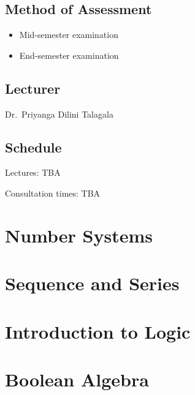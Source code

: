 \documentclass[]{book}
\providecommand{\tightlist}{%
  \setlength{\itemsep}{0pt}\setlength{\parskip}{0pt}}
\begin{document}
\hypertarget{method-of-assessment}{%
\section*{Method of Assessment}\label{method-of-assessment}}

\begin{itemize}
\tightlist
\item
  Mid-semester examination
\item
  End-semester examination
\end{itemize}

\hypertarget{lecturer}{%
\section*{Lecturer}\label{lecturer}}

Dr.~Priyanga Dilini Talagala

\hypertarget{schedule}{%
\section*{Schedule}\label{schedule}}

Lectures: TBA

Consultation times: TBA

\hypertarget{number-systems}{%
\chapter{Number Systems}\label{number-systems}}

\hypertarget{sequence-and-series}{%
\chapter{Sequence and Series}\label{sequence-and-series}}

\hypertarget{introduction-to-logic}{%
\chapter{Introduction to Logic}\label{introduction-to-logic}}

\hypertarget{boolean-algebra}{%
\chapter{Boolean Algebra}\label{boolean-algebra}}
\end{document}
